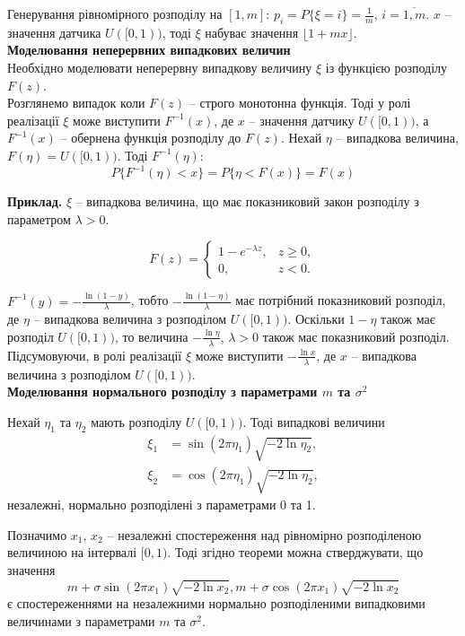 Генерування рівномірного розподілу на $[1, m]$: $p_i = P \{ \xi = i \} = \frac{1}{m}$, $i = \overline{1,m}$. $x$ -- значення датчика $U([0,1))$, тоді $\xi$ набуває значення $\lfloor 1 + m x \rfloor$. \\

\textbf{Моделювання неперервних випадкових величин} \\

Необхідно моделювати неперервну випадкову величину $\xi$ із функцією розподілу $F(z)$. \\

Розглянемо випадок коли $F(z)$ -- строго монотонна функція. Тоді у ролі реалізації $\xi$ може виступити $F^{-1}(x)$, де $x$ -- значення датчику $U([0,1))$, а $F^{-1}(x)$ -- обернена функція розподілу до $F(z)$. Нехай $\eta$ -- випадкова величина, $F(\eta) = U([0, 1))$. Тоді $F^{-1}(\eta)$:
\[ P\{ F^{-1}(\eta) < x \} = P \{ \eta < F(x) \} = F(x) \]

\textbf{Приклад.} $\xi$ -- випадкова величина, що має показниковий закон розподілу з параметром $\lambda > 0$.

\[ F(z) = \begin{cases} 1 - e^{-\lambda z}, & z \ge 0, \\ 0, & z < 0. \end{cases} \]

$F^{-1}(y) = - \frac{\ln(1-y)}{\lambda}$, тобто $- \frac{\ln(1 - \eta)}{\lambda}$ має потрібний показниковий розподіл, де $\eta$ -- випадкова величина з розподілом $U([0,1))$. Оскільки $1 - \eta$ також має розподіл $U([0,1))$, то величина $-\frac{\ln \eta}{\lambda}$, $\lambda > 0$ також має показниковий розподіл. Підсумовуючи, в ролі реалізації $\xi$ може виступити $-\frac{\ln x}{\lambda}$, де $x$ -- випадкова величина з розподілом $U([0,1))$. \\

\textbf{Моделювання нормального розподілу з параметрами $m$ та $\sigma^2$} 

\begin{theorem}
    Нехай $\eta_1$ та $\eta_2$ мають розподілу $U([0,1))$. Тоді випадкові величини
    \begin{align*}
        \xi_1 &= \sin(2 \pi \eta_1) \sqrt{-2 \ln \eta_2}, \\
        \xi_2 &= \cos(2 \pi \eta_1) \sqrt{-2 \ln \eta_2},
    \end{align*}
    незалежні, нормально розподілені з параметрами 0 та 1.
\end{theorem}

Позначимо $x_1$, $x_2$ -- незалежні спостереження над рівномірно розподіленою величиною на інтервалі $[0, 1)$. Тоді згідно теореми можна стверджувати, що значення 
\[ m + \sigma \sin (2 \pi x_1) \sqrt{- 2 \ln x_2}, m + \sigma \cos (2 \pi x_1) \sqrt{- 2 \ln x_2} \]
є спостереженнями на незалежними нормально розподіленими випадковими величинами з параметрами $m$ та $\sigma^2$. \\

